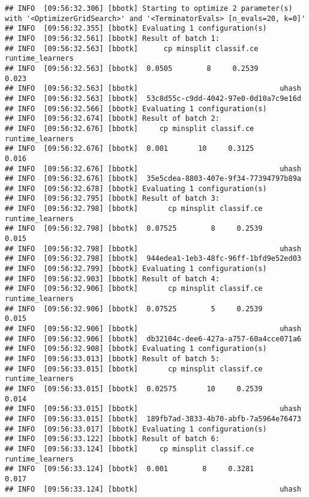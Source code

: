 \documentclass[
]{scrbook}
\begin{document}
\begin{verbatim}
## INFO  [09:56:32.306] [bbotk] Starting to optimize 2 parameter(s) with '<OptimizerGridSearch>' and '<TerminatorEvals> [n_evals=20, k=0]' 
## INFO  [09:56:32.355] [bbotk] Evaluating 1 configuration(s) 
## INFO  [09:56:32.561] [bbotk] Result of batch 1: 
## INFO  [09:56:32.563] [bbotk]      cp minsplit classif.ce runtime_learners 
## INFO  [09:56:32.563] [bbotk]  0.0505        8     0.2539            0.023 
## INFO  [09:56:32.563] [bbotk]                                 uhash 
## INFO  [09:56:32.563] [bbotk]  53c8d55c-c9dd-4042-97e0-0d10a7c9e16d 
## INFO  [09:56:32.566] [bbotk] Evaluating 1 configuration(s) 
## INFO  [09:56:32.674] [bbotk] Result of batch 2: 
## INFO  [09:56:32.676] [bbotk]     cp minsplit classif.ce runtime_learners 
## INFO  [09:56:32.676] [bbotk]  0.001       10     0.3125            0.016 
## INFO  [09:56:32.676] [bbotk]                                 uhash 
## INFO  [09:56:32.676] [bbotk]  35e5cdea-8803-407e-9f34-77394797b89a 
## INFO  [09:56:32.678] [bbotk] Evaluating 1 configuration(s) 
## INFO  [09:56:32.795] [bbotk] Result of batch 3: 
## INFO  [09:56:32.798] [bbotk]       cp minsplit classif.ce runtime_learners 
## INFO  [09:56:32.798] [bbotk]  0.07525        8     0.2539            0.015 
## INFO  [09:56:32.798] [bbotk]                                 uhash 
## INFO  [09:56:32.798] [bbotk]  944edea1-1eb3-48fc-96ff-1bfd9e52ed03 
## INFO  [09:56:32.799] [bbotk] Evaluating 1 configuration(s) 
## INFO  [09:56:32.903] [bbotk] Result of batch 4: 
## INFO  [09:56:32.906] [bbotk]       cp minsplit classif.ce runtime_learners 
## INFO  [09:56:32.906] [bbotk]  0.07525        5     0.2539            0.015 
## INFO  [09:56:32.906] [bbotk]                                 uhash 
## INFO  [09:56:32.906] [bbotk]  db32104c-dee6-427a-a757-60a4cce071a6 
## INFO  [09:56:32.908] [bbotk] Evaluating 1 configuration(s) 
## INFO  [09:56:33.013] [bbotk] Result of batch 5: 
## INFO  [09:56:33.015] [bbotk]       cp minsplit classif.ce runtime_learners 
## INFO  [09:56:33.015] [bbotk]  0.02575       10     0.2539            0.014 
## INFO  [09:56:33.015] [bbotk]                                 uhash 
## INFO  [09:56:33.015] [bbotk]  189fb7ad-3833-4b70-abfb-7a5964e76473 
## INFO  [09:56:33.017] [bbotk] Evaluating 1 configuration(s) 
## INFO  [09:56:33.122] [bbotk] Result of batch 6: 
## INFO  [09:56:33.124] [bbotk]     cp minsplit classif.ce runtime_learners 
## INFO  [09:56:33.124] [bbotk]  0.001        8     0.3281            0.017 
## INFO  [09:56:33.124] [bbotk]                                 uhash 

\end{verbatim}
\end{document}

